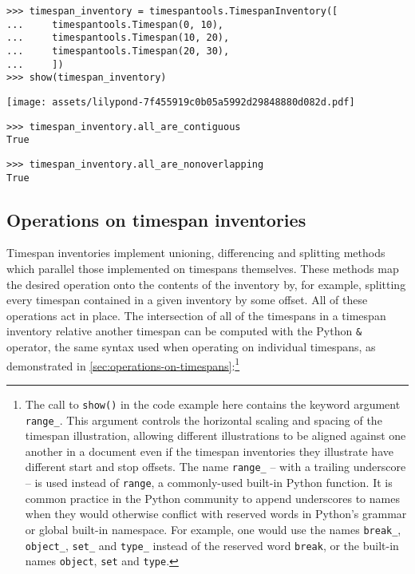 \begin{abjadbookoutput}
\begin{singlespacing}
\vspace{-0.5\baselineskip}
\begin{lstlisting}
>>> timespan_inventory = timespantools.TimespanInventory([
...     timespantools.Timespan(0, 10),
...     timespantools.Timespan(10, 20),
...     timespantools.Timespan(20, 30),
...     ])
>>> show(timespan_inventory)
\end{lstlisting}
\noindent\texttt{[image: assets/lilypond-7f455919c0b05a5992d29848880d082d.pdf]}
\begin{lstlisting}
>>> timespan_inventory.all_are_contiguous
True
\end{lstlisting}
\begin{lstlisting}
>>> timespan_inventory.all_are_nonoverlapping
True
\end{lstlisting}
\end{singlespacing}
\end{abjadbookoutput}

\subsection{Operations on timespan inventories} %

Timespan inventories implement unioning, differencing and splitting methods
which parallel those implemented on timespans themselves. These methods map the
desired operation onto the contents of the inventory by, for example, splitting
every timespan contained in a given inventory by some offset. All of these
operations act in place. The intersection of all of the timespans in a timespan
inventory relative another timespan can be computed with the Python \texttt{\&}
operator, the same syntax used when operating on individual timespans, as
demonstrated in \autoref{sec:operations-on-timespans}:\footnote{ The call to
\texttt{show()} in the code example here contains the keyword argument
\texttt{range\_}. This argument controls the horizontal scaling and spacing of
the timespan illustration, allowing different illustrations to be aligned
against one another in a document even if the timespan inventories they
illustrate have different start and stop offsets. The name \texttt{range\_} --
with a trailing underscore -- is used instead of \texttt{range}, a
commonly-used built-in Python function. It is common practice in the Python
community to append underscores to names when they would otherwise conflict
with reserved words in Python's grammar or global built-in namespace. For
example, one would use the names \texttt{break\_}, \texttt{object\_},
\texttt{set\_} and \texttt{type\_} instead of the reserved word \texttt{break},
or the built-in names \texttt{object}, \texttt{set} and \texttt{type}.}

